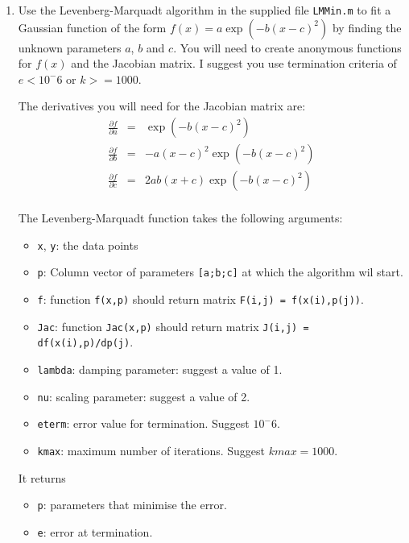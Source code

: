 \documentclass[12pt,a4paper]{tufte-handout}
\begin{document}
\begin{enumerate}
      Investigate the degree of polynomial ($n$ in the equation above) that best models this data using a weighted fit. Plot a graph of the least-squares versus the degree of polynomial. With reference to this graph, explain which polynomial you think is the best choice to model this data. 

      \textit{[Hint: use a \texttt{for} loop to loop through the polynomial degrees.]}

      \item Use the Levenberg-Marquadt algorithm in the supplied file \texttt{LMMin.m} to fit a Gaussian function of the form $f(x)=a \exp(-b(x-c)^2)$ by finding the unknown parameters $a$, $b$ and $c$. You will need to create anonymous functions for $f(x)$ and the Jacobian matrix. I suggest you use termination criteria of $e<10^-6$ or $k>=1000$.

        The derivatives you will need for the Jacobian matrix are:
        \begin{eqnarray*}
          \frac{\partial f}{\partial a} &=& \exp(-b(x-c)^2) \\
          \frac{\partial f}{\partial b} &=& -a(x-c)^2\exp(-b(x-c)^2) \\
          \frac{\partial f}{\partial c} &=& 2ab(x+c)\exp(-b(x-c)^2) \\
        \end{eqnarray*}

        The Levenberg-Marquadt function takes the following arguments:
        \begin{itemize}
          \item \texttt{x}, \texttt{y}: the data points
          \item \texttt{p}: Column vector of parameters \texttt{[a;b;c]} at which the algorithm wil start.
          \item \texttt{f}: function \texttt{f(x,p)} should return matrix \texttt{F(i,j) = f(x(i),p(j))}.
          \item \texttt{Jac}: function \texttt{Jac(x,p)} should return matrix \texttt{J(i,j) = df(x(i),p)/dp(j)}.
          \item \texttt{lambda}: damping parameter: suggest a value of 1.
          \item \texttt{nu}: scaling parameter: suggest a value of 2.
          \item \texttt{eterm}: error value for termination. Suggest $10^-6$.
          \item \texttt{kmax}: maximum number of iterations. Suggest $kmax=1000$.
        \end{itemize}
        It returns
        \begin{itemize}
          \item \texttt{p}: parameters that minimise the error.
          \item \texttt{e}: error at termination.
        \end{itemize}


\end{enumerate}
\end{document}
